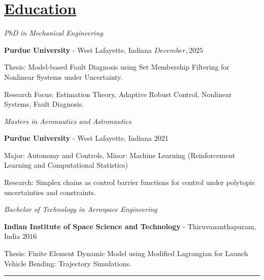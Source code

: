 \section*{\underline{Education}}

\noindent \textit{PhD in Mechanical Engineering}

\textbf{Purdue University} - West Lafayette, Indiana \hfill $December, 2025$

Thesis: Model-based Fault Diagnosis using Set Membership Filtering for Nonlinear Systems under Uncertainty.

Research Focus: Estimation Theory, Adaptive Robust Control, Nonlinear Systems, Fault Diagnosis.

\medskip

\noindent \textit{Masters in Aeronautics and Astronautics}

\textbf{Purdue University} - West Lafayette, Indiana \hfill $2021$

Major: Autonomy and Controls, Minor: Machine Learning (Reinforcement Learning and Computational Statistics)

Research: Simplex chains as control barrier functions for control under polytopic uncertainties and constraints.

\medskip

\noindent \textit{Bachelor of Technology in Aerospace Engineering }

\textbf{Indian Institute of Space Science and Technology} - Thiruvananthapuram, India \hfill $2016 $

Thesis: Finite Element Dynamic Model using Modified Lagrangian for Launch Vehicle Bending: Trajectory Simulations.

\noindent\rule{\textwidth}{0.4pt}
